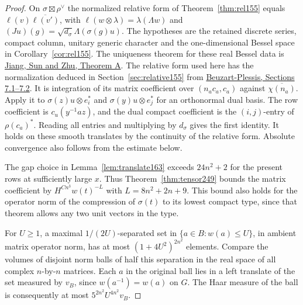\documentclass[a4paper,11pt]{article}
\theoremstyle{definition}
\theoremstyle{remark}
\numberwithin{equation}{section}
\begin{document}
\begin{proof}
On \(\sigma\boxtimes\rho^\vee\) the normalized relative form
of Theorem~\ref{thm:rel155} equals
\(\ell(v)\overline{\ell(v')}\), with
\(\ell(w\otimes\lambda)=\lambda(\Lambda w)\) and
\((Ju)(g)=\sqrt{d_\sigma}\Lambda(\sigma(g)u)\).
The hypotheses are the retained discrete series, compact column,
unitary generic character and the one-dimensional Bessel space
in Corollary~\ref{cor:rel155}. The uniqueness theorem for
these real Bessel data is
\href{https://arxiv.org/abs/0908.1728}{Jiang, Sun and Zhu,
Theorem A}. The relative form used here has the normalization
deduced in Section~\ref{sec:relative155} from
\href{https://arxiv.org/abs/1506.01452}{Beuzart-Plessis,
Sections 7.1--7.2}. It is integration
of its matrix coefficient over \((n_ac_a,c_a)\) against
\(\overline{\chi(n_a)}\). Apply it to
\(\sigma(z)u\otimes e_i^*\) and \(\sigma(y)u\otimes e_j^*\)
for an orthonormal dual basis. The row coefficient is
\(c_u(y^{-1}az)\), and the dual compact coefficient is the
\((i,j)\)-entry of \(\rho(c_a)^*\). Reading all entries and
multiplying by \(d_\sigma\) gives the first identity. It holds
on these smooth translates by the continuity of the relative
form. Absolute convergence also follows from the estimate below.

The gap choice in Lemma~\ref{lem:translate163} exceeds
\(24n^2+2\) for the present rows at sufficiently large \(x\).
Thus Theorem~\ref{thm:tensor249} bounds the matrix coefficient
by \(H^{Cn^3} w(t)^{-L}\) with \(L=8n^2+2n+9\). This bound
also holds for the operator norm of the compression
of \(\sigma(t)\) to its lowest compact type, since that theorem
allows any two unit vectors in the type.

For \(U\ge1\), a maximal \(1/(2U)\)-separated set in
\(\{a\in B:w(a)\le U\}\), in ambient matrix operator norm, has
at most \((1+4U^2)^{2n^2}\) elements. Compare the volumes of
disjoint norm balls of half this separation in the real space
of all complex \(n\)-by-\(n\) matrices. Each \(a\) in the
original ball lies in a left translate of the set measured by
\(v_B\), since \(w(a^{-1})=w(a)\) on \(G\). The Haar measure
of the ball is consequently at most
\(5^{2n^2} U^{4n^2}v_B\).


\end{proof}
\end{document}
